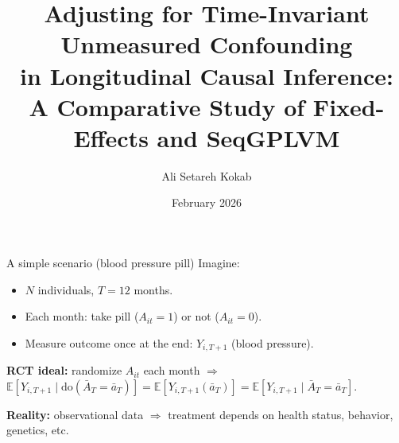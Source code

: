 \documentclass[aspectratio=169]{beamer}
\title[Fixed Effects vs SeqGPLVM]{Adjusting for Time-Invariant Unmeasured Confounding \\in Longitudinal Causal Inference: \\A Comparative Study of Fixed-Effects and SeqGPLVM}
\author{Ali Setareh Kokab}
\institute{University of Tübingen} %
\date{February 2026}
\begin{document}
\begin{frame}
  \titlepage
\end{frame}



\begin{frame}{A simple scenario (blood pressure pill)}
Imagine:
\begin{itemize}
  \item $N$ individuals, $T=12$ months.
  \item Each month: take pill ($A_{it}=1$) or not ($A_{it}=0$).
  \item Measure outcome once at the end: $Y_{i,T+1}$ (blood pressure).
\end{itemize}

\vspace{0.2cm}
\textbf{RCT ideal:} randomize $A_{it}$ each month $\Rightarrow$
$\mathbb{E}\!\left[Y_{i,T+1}\mid\text{do}(\bar A_T=\bar a_T)\right]
=
\mathbb{E}\!\left[Y_{i,T+1}(\bar a_T)\right]
=
\mathbb{E}\!\left[Y_{i,T+1}\mid \bar A_T=\bar a_T\right]
$.


\vspace{0.2cm}
\textbf{Reality:} observational data $\Rightarrow$ treatment depends on health status, behavior, genetics, etc.
\end{frame}
\end{document}
